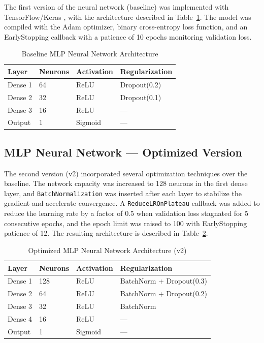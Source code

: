 \documentclass[conference]{IEEEtran}
\begin{document}
The first version of the neural network (baseline) was implemented with TensorFlow/Keras \cite{chollet2015}, with the architecture described in Table~\ref{tab:mlp_baseline}. The model was compiled with the Adam optimizer, binary cross-entropy loss function, and an EarlyStopping callback with a patience of 10 epochs monitoring validation loss.

\begin{table}[!ht]
\caption{Baseline MLP Neural Network Architecture}
\label{tab:mlp_baseline}
\centering
\begin{tabular}{llll}
\toprule
\textbf{Layer} & \textbf{Neurons} & \textbf{Activation} & \textbf{Regularization} \\
\midrule
Dense 1  & 64  & ReLU    & Dropout(0.2) \\
Dense 2  & 32  & ReLU    & Dropout(0.1) \\
Dense 3  & 16  & ReLU    & --- \\
Output   & 1   & Sigmoid & --- \\
\bottomrule
\end{tabular}
\end{table}

\subsection{MLP Neural Network --- Optimized Version}

The second version (v2) incorporated several optimization techniques over the baseline. The network capacity was increased to 128 neurons in the first dense layer, and \texttt{BatchNormalization} was inserted after each layer to stabilize the gradient and accelerate convergence. A \texttt{ReduceLROnPlateau} callback was added to reduce the learning rate by a factor of 0.5 when validation loss stagnated for 5 consecutive epochs, and the epoch limit was raised to 100 with EarlyStopping patience of 12. The resulting architecture is described in Table~\ref{tab:mlp_v2}.

\begin{table}[!ht]
\caption{Optimized MLP Neural Network Architecture (v2)}
\label{tab:mlp_v2}
\centering
\begin{tabular}{llll}
\toprule
\textbf{Layer} & \textbf{Neurons} & \textbf{Activation} & \textbf{Regularization} \\
\midrule
Dense 1  & 128 & ReLU    & BatchNorm + Dropout(0.3) \\
Dense 2  & 64  & ReLU    & BatchNorm + Dropout(0.2) \\
Dense 3  & 32  & ReLU    & BatchNorm \\
Dense 4  & 16  & ReLU    & --- \\
Output   & 1   & Sigmoid & --- \\
\bottomrule
\end{tabular}
\end{table}
\end{document}
